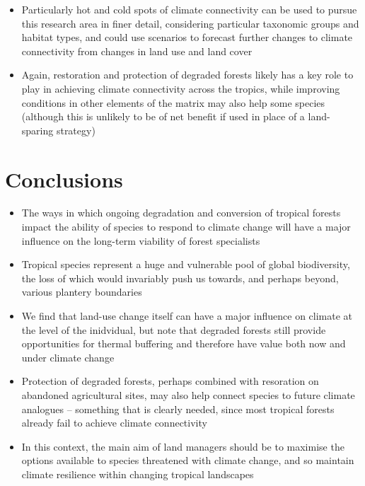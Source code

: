 \documentclass[12pt,a4paper,]{report}
\providecommand{\tightlist}{%
  \setlength{\itemsep}{0pt}\setlength{\parskip}{0pt}}
\theoremstyle{definition}
\theoremstyle{definition}
\theoremstyle{definition}
\theoremstyle{remark}
\begin{document}
\begin{itemize}
  \begin{itemize}
  \tightlist
  \item
    Particularly hot and cold spots of climate connectivity can be used
    to pursue this research area in finer detail, considering particular
    taxonomic groups and habitat types, and could use scenarios to
    forecast further changes to climate connectivity from changes in
    land use and land cover
  \item
    Again, restoration and protection of degraded forests likely has a
    key role to play in achieving climate connectivity across the
    tropics, while improving conditions in other elements of the matrix
    may also help some species (although this is unlikely to be of net
    benefit if used in place of a land-sparing strategy)
  \end{itemize}
\end{itemize}

\section{Conclusions}\label{conclusions-1}

\begin{itemize}
\tightlist
\item
  The ways in which ongoing degradation and conversion of tropical
  forests impact the ability of species to respond to climate change
  will have a major influence on the long-term viability of forest
  specialists
\item
  Tropical species represent a huge and vulnerable pool of global
  biodiversity, the loss of which would invariably push us towards, and
  perhaps beyond, various plantery boundaries
\item
  We find that land-use change itself can have a major influence on
  climate at the level of the inidvidual, but note that degraded forests
  still provide opportunities for thermal buffering and therefore have
  value both now and under climate change
\item
  Protection of degraded forests, perhaps combined with resoration on
  abandoned agricultural sites, may also help connect species to future
  climate analogues -- something that is clearly needed, since most
  tropical forests already fail to achieve climate connectivity
\item
  In this context, the main aim of land managers should be to maximise
  the options available to species threatened with climate change, and
  so maintain climate resilience within changing tropical landscapes
\end{itemize}
\end{document}
